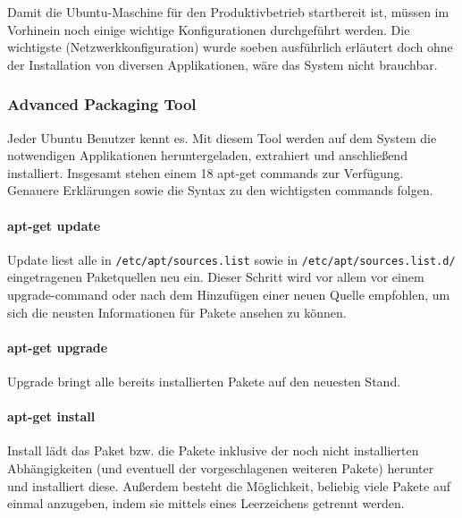 Damit die Ubuntu-Maschine für den Produktivbetrieb startbereit ist,
müssen im Vorhinein noch einige wichtige Konfigurationen durchgeführt
werden. Die wichtigste (Netzwerkkonfiguration) wurde soeben ausführlich
erläutert doch ohne der Installation von diversen Applikationen, wäre
das System nicht brauchbar.

\hypertarget{advanced-packaging-tool}{%
\subsubsection{Advanced Packaging Tool}\label{advanced-packaging-tool}}

Jeder Ubuntu Benutzer kennt es. Mit diesem Tool werden auf dem System
die notwendigen Applikationen heruntergeladen, extrahiert und
anschließend installiert. Insgesamt stehen einem 18 apt-get commands zur
Verfügung. Genauere Erklärungen sowie die Syntax zu den wichtigsten
commands folgen.

\hypertarget{apt-get-update}{%
\paragraph{apt-get update}\label{apt-get-update}}

Update liest alle in \texttt{/etc/apt/sources.list} sowie in
\texttt{/etc/apt/sources.list.d/} eingetragenen Paketquellen neu ein.
Dieser Schritt wird vor allem vor einem upgrade-command oder nach dem
Hinzufügen einer neuen Quelle empfohlen, um sich die neusten
Informationen für Pakete ansehen zu können.

\hypertarget{apt-get-upgrade}{%
\paragraph{apt-get upgrade}\label{apt-get-upgrade}}

Upgrade bringt alle bereits installierten Pakete auf den neuesten Stand.

\hypertarget{apt-get-install}{%
\paragraph{apt-get install}\label{apt-get-install}}

Install lädt das Paket bzw. die Pakete inklusive der noch nicht
installierten Abhängigkeiten (und eventuell der vorgeschlagenen weiteren
Pakete) herunter und installiert diese. Außerdem besteht die
Möglichkeit, beliebig viele Pakete auf einmal anzugeben, indem sie
mittels eines Leerzeichens getrennt werden.

